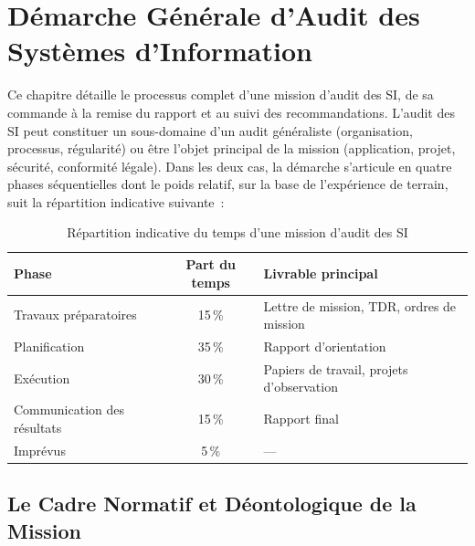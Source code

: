 
\chapter{Démarche Générale d'Audit des Systèmes d'Information}%
\label{chap:03_demarche}

Ce chapitre détaille le processus complet d'une mission d'audit des SI, de sa commande
à la remise du rapport et au suivi des recommandations. L'audit des SI peut constituer
un sous-domaine d'un audit généraliste (organisation, processus, régularité) ou être
l'objet principal de la mission (application, projet, sécurité, conformité légale).
Dans les deux cas, la démarche s'articule en quatre phases séquentielles dont le poids
relatif, sur la base de l'expérience de terrain, suit la répartition indicative suivante~:

\begin{table}[h!]
\centering
\small
\renewcommand{\arraystretch}{1.4}
\begin{tabular}{|l|c|l|}
    \hline
    \rowcolor{blue!10}
    \textbf{Phase} & \textbf{Part du temps} & \textbf{Livrable principal} \\ \hline
    Travaux préparatoires & 15\,\% & Lettre de mission, TDR, ordres de mission \\ \hline
    Planification & 35\,\% & Rapport d'orientation \\ \hline
    Exécution & 30\,\% & Papiers de travail, projets d'observation \\ \hline
    Communication des résultats & 15\,\% & Rapport final \\ \hline
    Imprévus & 5\,\% & — \\ \hline
\end{tabular}
\caption{Répartition indicative du temps d'une mission d'audit des SI}
\end{table}

\section{Le Cadre Normatif et Déontologique de la Mission}
\label{sec:cadre-normatif}

